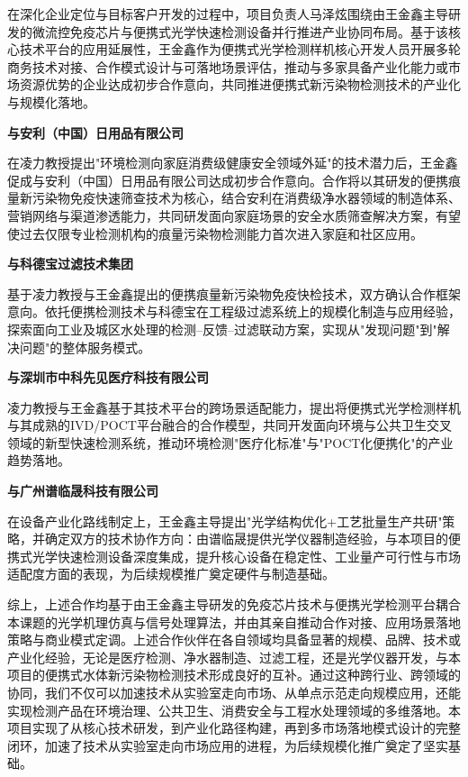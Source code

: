 \documentclass[12pt,a4paper]{article}
\begin{document}
在深化企业定位与目标客户开发的过程中，项目负责人马泽炫围绕由王金鑫主导研发的微流控免疫芯片与便携式光学快速检测设备并行推进产业协同布局。基于该核心技术平台的应用延展性，王金鑫作为便携式光学检测样机核心开发人员开展多轮商务技术对接、合作模式设计与可落地场景评估，推动与多家具备产业化能力或市场资源优势的企业达成初步合作意向，共同推进便携式新污染物检测技术的产业化与规模化落地。

\textbf{与安利（中国）日用品有限公司}

在凌力教授提出"环境检测向家庭消费级健康安全领域外延"的技术潜力后，王金鑫促成与安利（中国）日用品有限公司达成初步合作意向。合作将以其研发的便携痕量新污染物免疫快速筛查技术为核心，结合安利在消费级净水器领域的制造体系、营销网络与渠道渗透能力，共同研发面向家庭场景的安全水质筛查解决方案，有望使过去仅限专业检测机构的痕量污染物检测能力首次进入家庭和社区应用。

\textbf{与科德宝过滤技术集团}

基于凌力教授与王金鑫提出的便携痕量新污染物免疫快检技术，双方确认合作框架意向。依托便携检测技术与科德宝在工程级过滤系统上的规模化制造与应用经验，探索面向工业及城区水处理的检测--反馈--过滤联动方案，实现从"发现问题"到"解决问题"的整体服务模式。

\textbf{与深圳市中科先见医疗科技有限公司}

凌力教授与王金鑫基于其技术平台的跨场景适配能力，提出将便携式光学检测样机与其成熟的IVD/POCT平台融合的合作模型，共同开发面向环境与公共卫生交叉领域的新型快速检测系统，推动环境检测"医疗化标准"与"POCT化便携化"的产业趋势落地。

\textbf{与广州谱临晟科技有限公司}

在设备产业化路线制定上，王金鑫主导提出"光学结构优化+工艺批量生产共研"策略，并确定双方的技术协作方向：由谱临晟提供光学仪器制造经验，与本项目的便携式光学快速检测设备深度集成，提升核心设备在稳定性、工业量产可行性与市场适配度方面的表现，为后续规模推广奠定硬件与制造基础。

综上，上述合作均基于由王金鑫主导研发的免疫芯片技术与便携光学检测平台耦合本课题的光学机理仿真与信号处理算法，并由其亲自推动合作对接、应用场景落地策略与商业模式定调。上述合作伙伴在各自领域均具备显著的规模、品牌、技术或产业化经验，无论是医疗检测、净水器制造、过滤工程，还是光学仪器开发，与本项目的便携式水体新污染物检测技术形成良好的互补。通过这种跨行业、跨领域的协同，我们不仅可以加速技术从实验室走向市场、从单点示范走向规模应用，还能实现检测产品在环境治理、公共卫生、消费安全与工程水处理领域的多维落地。本项目实现了从核心技术研发，到产业化路径构建，再到多市场落地模式设计的完整闭环，加速了技术从实验室走向市场应用的进程，为后续规模化推广奠定了坚实基础。
\end{document}
